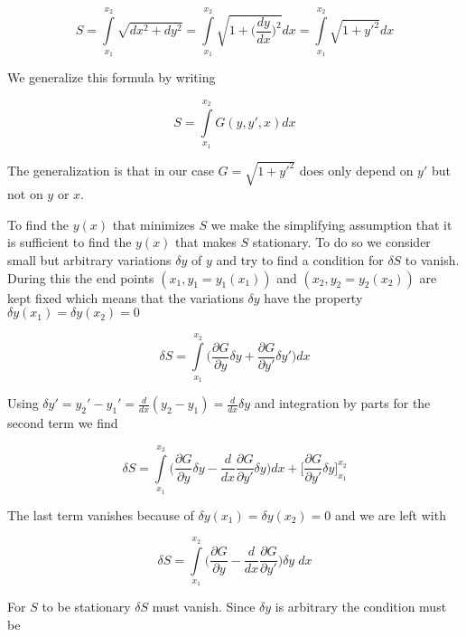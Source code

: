 \documentclass{article}
\begin{document}
\begin{equation}
S=\int\limits_{x_1}^{x_2}\sqrt{dx^2 + dy^2} 
= \int\limits_{x_1}^{x_2}\sqrt{1 + \Big(\frac{dy}{dx}\Big)^2} dx
= \int\limits_{x_1}^{x_2}\sqrt{1 + y'^2} dx
\end{equation}

We generalize this formula by writing

\begin{equation}
S=\int\limits_{x_1}^{x_2} G(y,y',x) dx  
\end{equation}

The generalization is that in our case $G = \sqrt{1 + y'^2}$ does only depend on $y'$ but not on $y$ or $x$.

To find the $y(x)$ that minimizes $S$ we make the simplifying assumption that it is sufficient to find the $y(x)$ that makes $S$ stationary. To do so we consider small but arbitrary variations $\delta y$ of $y$ and try to find a condition for $\delta S$ to vanish. During this the end points $(x_1,y_1=y_1(x_1))$ and $(x_2,y_2=y_2(x_2))$ are kept fixed which means that the variations $\delta y$ have the property $\delta y(x_1) = \delta y(x_2) = 0$

\begin{equation}
\delta S = \int\limits_{x_1}^{x_2} \bigg(\frac{\partial G}{\partial y} \delta y 
+ \frac{\partial G}{\partial y'} \delta y' \bigg) dx 
\end{equation}

Using $\delta y' = y_2' - y_1' = \frac{d}{dx}(y_2 - y_1) = \frac{d}{dx} \delta y$ and integration by parts for the second term we find

\begin{equation}
\delta S = \int\limits_{x_1}^{x_2} \bigg( \frac{\partial G}{\partial y} \delta y 
- \frac{d}{dx}\frac{\partial G}{\partial y'} \delta y \bigg) dx 
+ \bigg[\frac{\partial G}{\partial y'} \delta y \bigg]_{x_1}^{x_2}
\end{equation}

The last term vanishes because of $\delta y(x_1) = \delta y(x_2) = 0$ and we are left with


\begin{equation}
\delta S = \int\limits_{x_1}^{x_2} \bigg( \frac{\partial G}{\partial y} 
- \frac{d}{dx}\frac{\partial G}{\partial y'} \bigg) \delta y \; dx 
\end{equation}

For $S$ to be stationary $\delta S$ must vanish. Since $\delta y$ is arbitrary the condition must be
\end{document}
